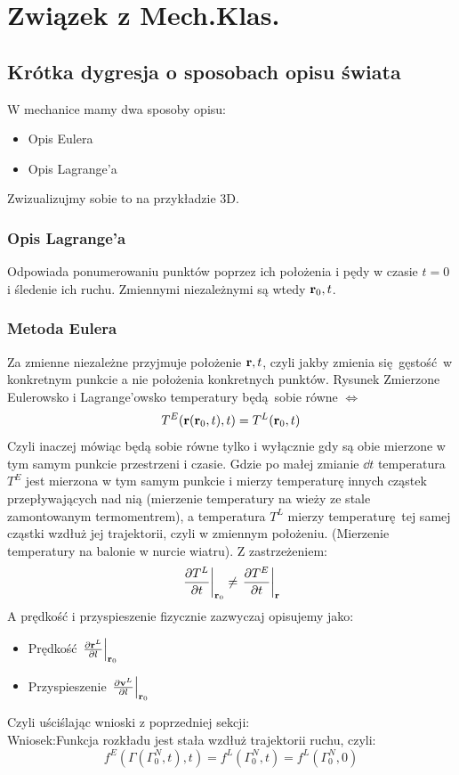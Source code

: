 \documentclass[12pt,a4paper]{report}
\newcommand{\com}[1]{{\color{red} #1}}
\newcommand{\wniosek}{{\color{orange} Wniosek:}}
\newenvironment{lecture}[1]{\par\medskip
   \noindent\chapter{#1} \rmfamily}{\medskip}
\begin{document}
\begin{lecture}{Związek z Mech.Klas.}
    \section{Krótka dygresja o sposobach opisu świata}
    W mechanice mamy dwa sposoby opisu:
    \begin{itemize}
        \item Opis Eulera
        \item Opis Lagrange'a
    \end{itemize}
    Zwizualizujmy sobie to na przykładzie 3D.
    \subsection{Opis Lagrange'a}
    Odpowiada ponumerowaniu punktów poprzez ich położenia i pędy w czasie $t=0$ i śledenie ich ruchu. Zmiennymi niezależnymi są wtedy $\vb{r}_0, t$.
    \subsection{Metoda Eulera}
    Za zmienne niezależne przyjmuje położenie $\vb{r}, t$, czyli jakby zmienia się gęstość w konkretnym punkcie a nie położenia konkretnych punktów.
    \com{Rysunek}
    Zmierzone Eulerowsko i Lagrange'owsko temperatury będą sobie równe $\iff$
    \[
        T^E(\vb{r}(\vb{r}_0, t), t) = T^L(\vb{r}_0, t)
    \]
    Czyli inaczej mówiąc będą sobie równe tylko i wyłącznie gdy są obie mierzone w tym samym punkcie przestrzeni i czasie.
    Gdzie po małej zmianie $\dd{t}$ temperatura $T^E$ jest mierzona w tym samym punkcie i mierzy temperaturę innych cząstek przepływających nad nią (mierzenie temperatury na wieży ze stale zamontowanym termomentrem), a temperatura $T^L$ mierzy temperaturę tej samej cząstki wzdłuż jej trajektorii, czyli w zmiennym położeniu. (Mierzenie temperatury na balonie w nurcie wiatru). Z zastrzeżeniem:
    \[
        \eval{\pdv{T^L}{t}}_{\vb{r}_0} \neq \eval{\pdv{T^E}{t}}_{\vb{r}}
    \]
    A prędkość i przyspieszenie fizycznie zazwyczaj opisujemy jako:
    \begin{itemize}
        \item Prędkość $\eval{\pdv{\vb{r}^L}{l}}_{\vb{r}_0}$
        \item Przyspieszenie $\eval{\pdv{\vb{v}^L}{l}}_{\vb{r}_0}$
    \end{itemize}
    Czyli uściślając wnioski z poprzedniej sekcji:\\
    \wniosek Funkcja rozkładu jest stała wzdłuż trajektorii ruchu, czyli:
    \begin{equation}
        f^E(\Gamma(\Gamma_0^N, t), t) = f^L(\Gamma_0^N, t) = f^L(\Gamma_0^N, 0)
        \label{eq:lec_15:rozklady}
    \end{equation}

\end{lecture}
\end{document}
